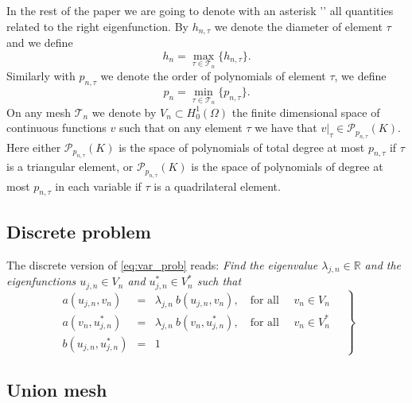 \documentclass[smallextended]{svjour3}
\begin{document}
In the rest of the paper we are going to denote with an asterisk '{\tt *}'  all quantities related 
to the right eigenfunction. By $h_{n,\tau}$ we denote the diameter of element $\tau$ and
we define
$$
h_n=\max_{\tau\in \mathcal{T}_n}\{h_{n,\tau}\}.
$$
Similarly with  $p_{n,\tau}$ we denote  the order of polynomials of element $\tau$,  
we define
$$
p_n=\min_{\tau\in \mathcal{T}_n}\{p_{n,\tau}\}.
$$
On any mesh $\mathcal{T}_n$ we denote by $V_n \subset H^1_0(\Omega)$ the finite
dimensional space of continuous functions $v$ such that on any element $\tau$ we 
have that $v|_\tau\in \mathcal{P}_{p_{n,\tau}}(K)$. Here either $\mathcal{P}_{p_{n,\tau}}(K)$ 
is the space of polynomials of total degree at most $p_{n,\tau}$ if $\tau$ is a triangular 
element, or $\mathcal{P}_{p_{n,\tau}}(K)$ is the space of polynomials of degree at most 
$p_{n,\tau}$ in each variable if $\tau$ is a quadrilateral element.

\subsection{Discrete problem}

The discrete version of \eqref{eq:var_prob} reads:
\emph{Find the eigenvalue $\lambda_{j,n}\in \mathbb{R}$ and the eigenfunctions $u_{j,n}\in V_n$ and $u_{j,n}^*\in V_n^*$
such that}
\begin{equation}
\label{eq:disc_prob}
\left.
\begin{array}{lcl}
a(u_{j,n},v_{n})&=& \lambda_{j,n}\ b(u_{j,n},v_{n}),
\quad \text{for all } \quad v_{n}  \in V_n\\
a(v_{n},u_{j,n}^*)&=& \lambda_{j,n}\ b(v_{n},u_{j,n}^*),
\quad \text{for all } \quad v_{n}  \in V_n^*\\
 b(u_{j,n},u_{j,n}^*) &=& 1
\end{array}\quad
\right\}
\end{equation}

\subsection{Union mesh}
\end{document}
